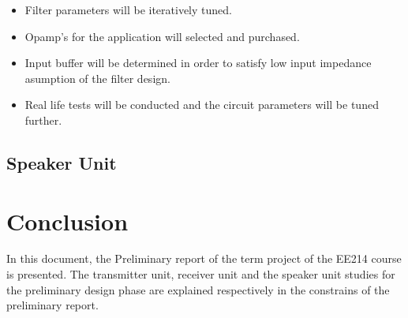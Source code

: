 \documentclass[letterpaper,12pt]{article}
\begin{document}
\begin{itemize}
    \item Filter parameters will be iteratively tuned.
    \item Opamp's for the application will selected and purchased.
    \item Input buffer will be determined in order to satisfy low input impedance asumption of the filter design.
    \item Real life tests will be conducted and the circuit parameters will be tuned further.
\end{itemize}
\subsection{Speaker Unit}

\section{Conclusion}
In this document, the Preliminary report of the term project of the EE214 course is presented. The transmitter unit, receiver unit and the speaker unit studies for the preliminary design phase are explained respectively in the constrains of the preliminary report.
\end{document}
